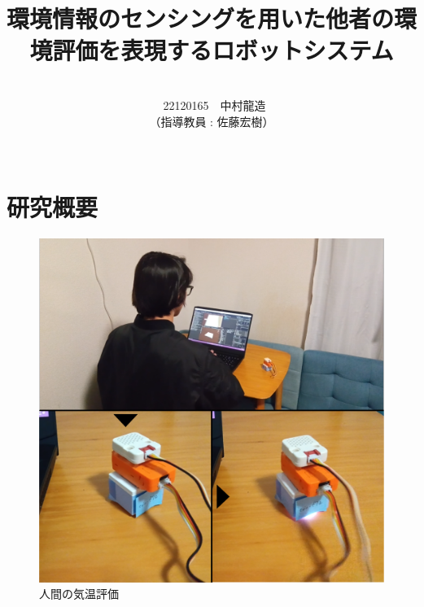 \documentclass[paper=a4paper,jafontsize=9pt,head_space=15mm,gutter=20mm,
twocolumn,number_of_lines=49, line_length=26zw]{myuarticle}
\begin{document}
\title{{\Large\bfseries\gtfamily 環境情報のセンシングを用いた他者の環境評価を表現するロボットシステム}}
\author{\\\ 22120165　中村龍造 \\（指導教員 : 佐藤宏樹）\\ \\}
\date{}
\maketitle

\section*{研究概要}

\begin{figure}[b]
  \begin{center}
    \begin{minipage}[b]{0.23\textwidth}
      \centering
      \includegraphics[keepaspectratio, scale=0.1]{resources/human.png}
      \caption{人間の気温評価}
    \end{minipage}
    \begin{minipage}[b]{0.23\textwidth}
      \centering

\end{minipage}
\end{center}
\end{figure}
\end{document}

